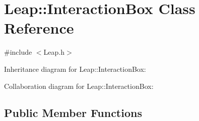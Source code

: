 \hypertarget{class_leap_1_1_interaction_box}{}\section{Leap\+:\+:Interaction\+Box Class Reference}
\label{class_leap_1_1_interaction_box}


{\ttfamily \#include $<$Leap.\+h$>$}



Inheritance diagram for Leap\+:\+:Interaction\+Box\+:


Collaboration diagram for Leap\+:\+:Interaction\+Box\+:
\subsection*{Public Member Functions}
